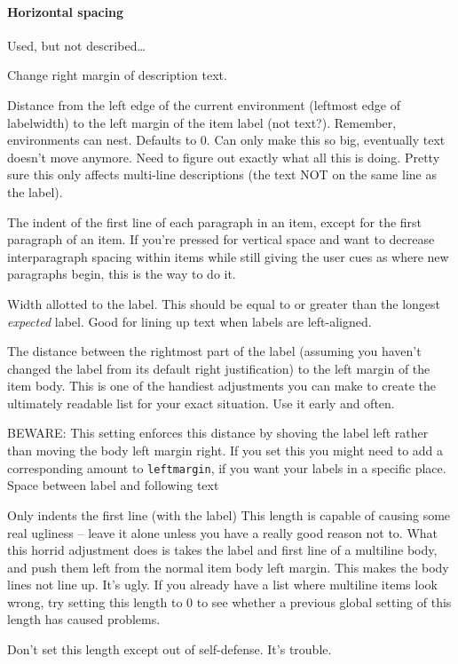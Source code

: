 \documentclass{article}
\begin{document}
\paragraph{Horizontal spacing}
\begin{description}[labelindent=2cm, leftmargin=\labelindent]
    \item [labelindent] Used, but not described\ldots
    \item [rightmargin] Change right margin of description text.
    \item [leftmargin] Distance from the left edge of the current
        environment (leftmost edge of labelwidth) to the left margin of the
        item label (not text?). Remember, environments can nest. Defaults to 0.
        Can only make this so big, eventually text doesn't move anymore.
        Need to figure out exactly what all this is doing.
        Pretty sure this only affects multi-line descriptions
        (the text NOT on the same line as the label).
    \item [listparindent] The indent of the first line of each
        paragraph in an item, except for the first paragraph of an
        item. If you're pressed for vertical space and want to
        decrease interparagraph spacing within items while still
        giving the user cues as where new paragraphs begin, this is
        the way to do it.
    \item [labelwidth]
        Width allotted to the label. This should be equal to or
        greater than the longest \emph{expected} label.  Good for
        lining up text when labels are left-aligned.
    \item [labelsep]
        The distance between the rightmost part of the label (assuming
        you haven't changed the label from its default right
        justification) to the left margin of the item body. This is
        one of the handiest adjustments you can make to create the
        ultimately readable list for your exact situation. Use it
        early and often.

        BEWARE\@: This setting enforces this distance by shoving the
        label left rather than moving the body left margin right. If
        you set this you might need to add a corresponding amount to
        \texttt{leftmargin}, if you want your labels in a specific place.
        Space between label and following text
    \item [itemindent] Only indents the first line (with the label)
        This length is capable of causing some real ugliness -- leave
        it alone unless you have a really good reason not to. What
        this horrid adjustment does is takes the label and first line
        of a multiline body, and push them left from the normal item
        body left margin. This makes the body lines not line up. It's
        ugly. If you already have a list where multiline items look
        wrong, try setting this length to 0 to see whether a previous
        global setting of this length has caused problems.

        Don't set this length except out of self-defense. It's trouble.
\end{description}
\end{document}
